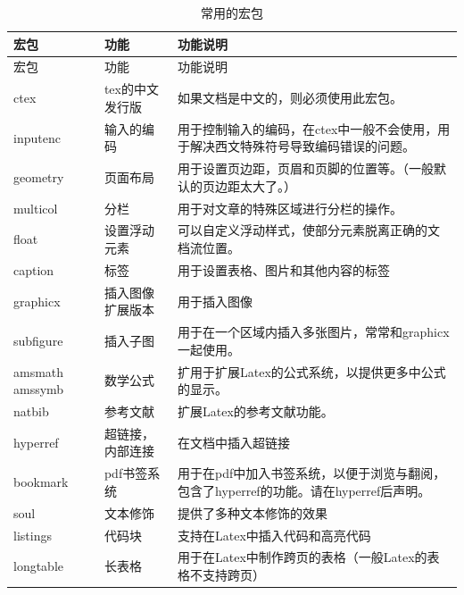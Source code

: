 \documentclass{article}
\begin{document}
            \begin{center}
                \begin{longtable}{p{2cm}p{3.5cm}p{9cm}}
                        \hline
                        宏包 & 功能 & 功能说明 \\
                        \hline
                    \endfirsthead
                        \hline
                        宏包 & 功能 & 功能说明 \\
                        \hline
                    \endhead
                        \hline
                    \endfoot
                        \hline
                        \caption{常用的宏包}
                    \endlastfoot
                    ctex & tex的中文发行版 & 如果文档是中文的，则必须使用此宏包。 \\
                    inputenc & 输入的编码 & 用于控制输入的编码，在ctex中一般不会使用，用于解决西文特殊符号导致编码错误的问题。\\
                    geometry & 页面布局 & 用于设置页边距，页眉和页脚的位置等。（一般默认的页边距太大了。） \\
                    multicol & 分栏 & 用于对文章的特殊区域进行分栏的操作。 \\
                    float & 设置浮动元素 & 可以自定义浮动样式，使部分元素脱离正确的文档流位置。 \\
                    caption & 标签 & 用于设置表格、图片和其他内容的标签 \\
                    graphicx & 插入图像扩展版本 & 用于插入图像 \\
                    subfigure & 插入子图 & 用于在一个区域内插入多张图片，常常和graphicx一起使用。 \\
                    amsmath amssymb & 数学公式 & 扩用于扩展Latex的公式系统，以提供更多中公式的显示。 \\
                    natbib & 参考文献 & 扩展Latex的参考文献功能。 \\
                    hyperref & 超链接，内部连接 & 在文档中插入超链接 \\
                    bookmark & pdf书签系统 & 用于在pdf中加入书签系统，以便于浏览与翻阅，包含了hyperref的功能。请在hyperref后声明。\\
                    soul & 文本修饰 & 提供了多种文本修饰的效果 \\
                    listings & 代码块 & 支持在Latex中插入代码和高亮代码 \\
                    longtable & 长表格 & 用于在Latex中制作跨页的表格（一般Latex的表格不支持跨页） \\
                \end{longtable}
            \end{center}
\end{document}
